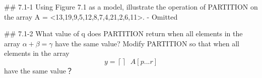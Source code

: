 
## 7.1-1 Using Figure 7.1 as a model, illustrate the operation of PARTITION on the array A = <13,19,9,5,12,8,7,4,21,2,6,11>.
- Omitted

## 7.1-2  What value of q does PARTITION return when all elements in the array \(\alpha+\beta=\gamma\) have the same value? Modify PARTITION so that  when all elements in the array $$y=\left\lceil  \right\rceil\; \; A\left[ p...r \right]$$ have the same value？